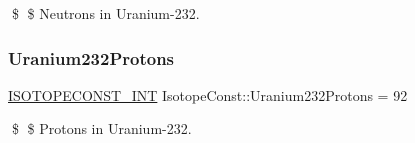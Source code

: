 \$ \$ Neutrons in Uranium-\/232. \mbox{\label{group___isotope_const-_uranium-_u232_gae3f42fd75d9858a8c7efdb96ab8d0202}} 
\subsubsection{\texorpdfstring{Uranium232\+Protons}{Uranium232Protons}}
{\footnotesize\ttfamily \mbox{\hyperlink{group___isotope_const-_macros_ga5f18360b3e99483a35c32d789e62621c}{I\+S\+O\+T\+O\+P\+E\+C\+O\+N\+S\+T\+\_\+\+I\+NT}} Isotope\+Const\+::\+Uranium232\+Protons = 92}

\$ \$ Protons in Uranium-\/232. 